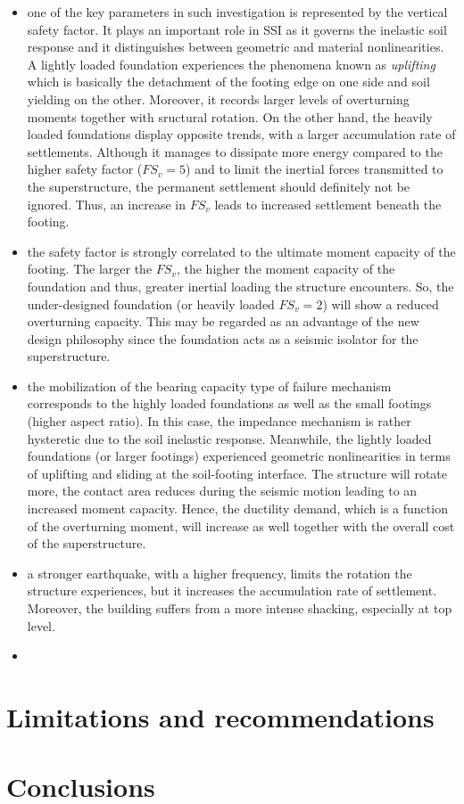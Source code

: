 \begin{itemize} 
	\item one of the key parameters in such investigation is represented by the vertical safety factor. It plays an important role in SSI as it governs the inelastic soil response and it distinguishes between geometric and material nonlinearities. A lightly loaded foundation experiences the phenomena known as \textit{uplifting} which is basically the detachment of the footing edge on one side and soil yielding on the other. Moreover, it records larger levels of overturning moments together with sructural rotation. On the other hand, the heavily loaded foundations display opposite trends, with a larger accumulation rate of settlements. Although it manages to dissipate more energy compared to the higher safety factor ($FS_v=5$) and to limit the inertial forces transmitted to the superstructure, the permanent settlement should definitely not be ignored. Thus, an increase in $FS_v$ leads to increased settlement beneath the footing.
	\item the safety factor is strongly correlated to the ultimate moment capacity of the footing. The larger the $FS_v$, the higher the moment capacity of the foundation and thus, greater inertial loading the structure encounters. So, the under-designed foundation (or heavily loaded $FS_v=2$) will show a reduced overturning capacity. This may be regarded as an advantage of the new design philosophy since the foundation acts as a seismic isolator for the superstructure.
	\item the mobilization of the bearing capacity type of failure mechanism corresponds to the highly loaded foundations as well as the small footings (higher aspect ratio). In this case, the impedance mechanism is rather hysteretic due to the soil inelastic response. Meanwhile, the lightly loaded foundations (or larger footings) experienced geometric nonlinearities in terms of uplifting and sliding at the soil-footing interface. The structure will rotate more, the contact area reduces during the seismic motion leading to an increased moment capacity. Hence, the ductility demand, which is a function of the overturning moment, will increase as well together with the overall cost of the superstructure.
	\item a stronger earthquake, with a higher frequency, limits the rotation the structure experiences, but it increases the accumulation rate of settlement. Moreover, the building suffers from a more intense shacking, especially at top level. 
	\item 
\end{itemize}

\section{Limitations and recommendations}


\newpage


\section{Conclusions}

